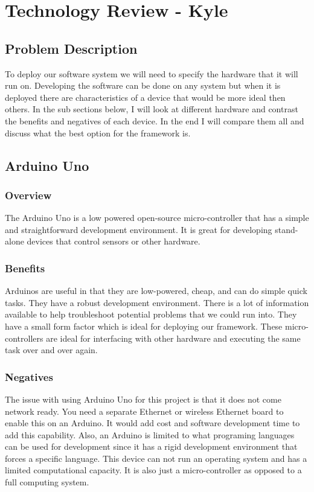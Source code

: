 \documentclass[draftclsnofoot, onecolumn, compsoc, 10pt]{IEEEtran}
\begin{document}
\section{Technology Review - Kyle}
\subsection{Problem Description}
To deploy our software system we will need to specify the hardware that it will run on. Developing the software can be done on any system but when it is deployed there are characteristics of a device that would be more ideal then others.  In the sub sections below, I will look at different hardware and contrast the benefits and negatives of each device. In the end I will compare them all and discuss what the best option for the framework is.

\subsection{Arduino Uno}
\subsubsection{Overview}
The Arduino Uno is a low powered open-source micro-controller that has a simple and straightforward development environment. It is great for developing stand-alone devices that control sensors or other hardware. \cite{ada}
\subsubsection{Benefits}
Arduinos are useful in that they are low-powered, cheap, and can do simple quick tasks. They have a robust development environment. There is a lot of information available to help troubleshoot potential problems that we could run into. They have a small form factor which is ideal for deploying our framework. These micro-controllers are ideal for interfacing with other hardware and executing the same task over and over again.
\subsubsection{Negatives}
The issue with using Arduino Uno for this project is that it does not come network ready. You need a separate Ethernet or wireless Ethernet board to enable this on an Arduino. It would add cost and software development time to add this capability. Also, an Arduino is limited to what programing languages can be used for development since it has a rigid development environment that forces a specific language. This device can not run an operating system and has a limited computational capacity. It is also just a micro-controller as opposed to a full computing system. \cite{ada}
\end{document}
